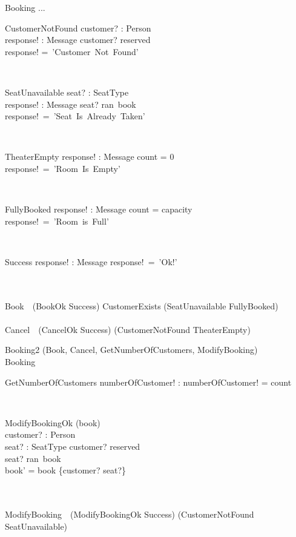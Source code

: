 \documentclass[12pt]{article}
\begin{document}
\begin{class}{Booking}
...\\
\begin{op}{CustomerNotFound}
customer? : Person\\
response! : Message
\ST
customer? \notin reserved\\
response! =~'Customer~Not~Found'
\end{op}\\
\begin{op}{SeatUnavailable}
seat? : SeatType\\
response! : Message
\ST
seat? \in ran~book\\
response!~=~'Seat~Is~Already~Taken'
\end{op}\\
\begin{op}{TheaterEmpty}
response! : Message
\ST
count = 0\\
response!~=~'Room~Is~Empty'
\end{op}\\
\begin{op}{FullyBooked}
response! : Message
\ST
count = capacity\\
response!~=~'Room~is~Full'
\end{op}\\
\begin{op}{Success}
response! : Message
\ST
response!~=~'Ok!'
\end{op}\\
\ \\
Book~\hat{=}~(BookOk \wedge Success) \oplus CustomerExists \oplus (SeatUnavailable \vee FullyBooked)\\
\ \\
Cancel~\hat{=}~(CancelOk \wedge Success) \oplus (CustomerNotFound \vee TheaterEmpty)\\
\end{class}

\begin{class}{Booking2}
\also
\upharpoonright (Book, Cancel, GetNumberOfCustomers, ModifyBooking) \\
Booking\\
\begin{op}{GetNumberOfCustomers}
numberOfCustomer! :  
\ST
numberOfCustomer! = count
\end{op}\\
\begin{op}{ModifyBookingOk}
\Delta (book) \\
customer? : Person\\
seat? : SeatType
\ST
customer? \in reserved\\
seat? \notin ran~book\\
book' = book \oplus \{customer? \mapsto seat?\}
\end{op}\\
\ \\
ModifyBooking~\hat{=}~(ModifyBookingOk \wedge Success) \oplus (CustomerNotFound \vee SeatUnavailable)\\
\end{class}
\end{document}
